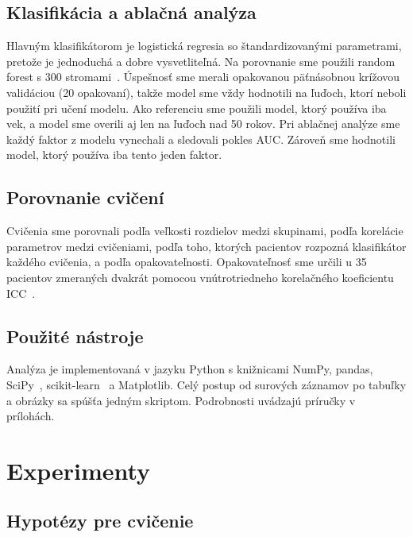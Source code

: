 \documentclass[12pt,a4paper]{article}
\begin{document}
\subsection{Klasifikácia a ablačná analýza}

Hlavným klasifikátorom je logistická regresia so štandardizovanými parametrami, pretože je jednoduchá a dobre
vysvetliteľná. Na porovnanie sme použili random forest s 300 stromami~\cite{breiman2001}. Úspešnosť sme merali
opakovanou päťnásobnou krížovou validáciou (20 opakovaní), takže model sme vždy hodnotili na ľuďoch, ktorí neboli
použití pri učení modelu. Ako referenciu sme použili model, ktorý používa iba vek, a model sme overili aj len na ľuďoch nad 50 rokov.
Pri ablačnej analýze sme každý faktor z modelu vynechali a sledovali pokles AUC. Zároveň sme hodnotili model, ktorý
používa iba tento jeden faktor.

\subsection{Porovnanie cvičení}

Cvičenia sme porovnali podľa veľkosti rozdielov medzi skupinami, podľa korelácie parametrov medzi cvičeniami, podľa toho,
ktorých pacientov rozpozná klasifikátor každého cvičenia, a podľa opakovateľnosti. Opakovateľnosť sme určili u 35
pacientov zmeraných dvakrát pomocou vnútrotriedneho korelačného koeficientu ICC~\cite{koo2016}.

\subsection{Použité nástroje}

Analýza je implementovaná v jazyku Python s knižnicami NumPy, pandas, SciPy~\cite{scipy2020}, scikit-learn~\cite{sklearn2011}
a Matplotlib. Celý postup od surových záznamov po tabuľky a obrázky sa spúšťa jedným skriptom. Podrobnosti uvádzajú
príručky v prílohách.

\section{Experimenty}
\label{sec:experimenty}

\subsection{Hypotézy pre cvičenie \ef{}}
\end{document}
